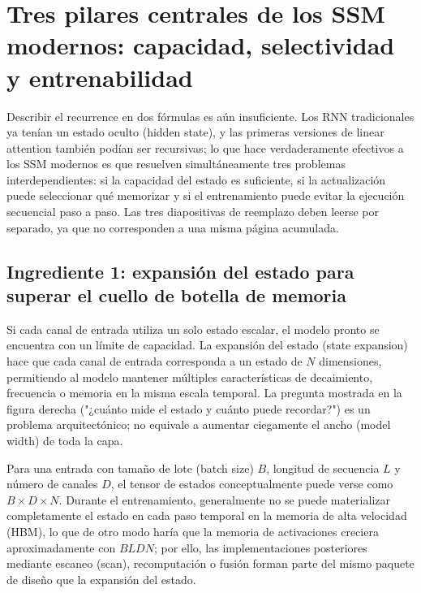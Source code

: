 \section{Tres pilares centrales de los SSM modernos: capacidad, selectividad y entrenabilidad}

Describir el recurrence en dos fórmulas es aún insuficiente. Los RNN tradicionales ya tenían un estado oculto (hidden state), y las primeras versiones de linear attention también podían ser recursivas; lo que hace verdaderamente efectivos a los SSM modernos es que resuelven simultáneamente tres problemas interdependientes: si la capacidad del estado es suficiente, si la actualización puede seleccionar qué memorizar y si el entrenamiento puede evitar la ejecución secuencial paso a paso. Las tres diapositivas de reemplazo deben leerse por separado, ya que no corresponden a una misma página acumulada.

\subsection{Ingrediente 1: expansión del estado para superar el cuello de botella de memoria}

Si cada canal de entrada utiliza un solo estado escalar, el modelo pronto se encuentra con un límite de capacidad. La expansión del estado (state expansion) hace que cada canal de entrada corresponda a un estado de $N$ dimensiones, permitiendo al modelo mantener múltiples características de decaimiento, frecuencia o memoria en la misma escala temporal. La pregunta mostrada en la figura derecha ("¿cuánto mide el estado y cuánto puede recordar?") es un problema arquitectónico; no equivale a aumentar ciegamente el ancho (model width) de toda la capa.


Para una entrada con tamaño de lote (batch size) $B$, longitud de secuencia $L$ y número de canales $D$, el tensor de estados conceptualmente puede verse como $B\times D\times N$. Durante el entrenamiento, generalmente no se puede materializar completamente el estado en cada paso temporal en la memoria de alta velocidad (HBM), lo que de otro modo haría que la memoria de activaciones creciera aproximadamente con $BLDN$; por ello, las implementaciones posteriores mediante escaneo (scan), recomputación o fusión forman parte del mismo paquete de diseño que la expansión del estado.

